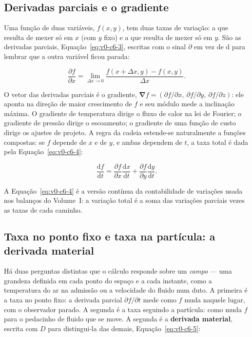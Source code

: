 \documentclass[12pt,a4paper]{article}
\numberwithin{equation}{section}
\numberwithin{table}{section}
\numberwithin{figure}{section}
\begin{document}
\subsection{Derivadas parciais e o gradiente}

Uma função de duas variáveis, $f(x,y)$, tem duas taxas de variação: a que
resulta de mexer só em $x$ (com $y$ fixo) e a que resulta de mexer só em
$y$. São as derivadas parciais, Equação~\eqref{eq:v0-c6-3}, escritas com o
sinal $\partial$ em vez de $\mathrm{d}$ para lembrar que a outra variável
ficou parada:

\begin{equation}\label{eq:v0-c6-3}
\frac{\partial f}{\partial x}
  = \lim_{\Delta x \to 0}
    \frac{f(x+\Delta x, y) - f(x,y)}{\Delta x}.
\end{equation}

O vetor das derivadas parciais é o gradiente,
$\bm{\nabla} f = (\partial f/\partial x,\ \partial f/\partial y,\ 
\partial f/\partial z)$: ele aponta na direção de maior crescimento de
$f$ e seu módulo mede a inclinação máxima. O gradiente de temperatura
dirige o fluxo de calor na lei de Fourier; o gradiente de pressão dirige o
escoamento; o gradiente de uma função de custo dirige os ajustes de
projeto. A regra da cadeia estende-se naturalmente a funções compostas: se
$f$ depende de $x$ e de $y$, e ambas dependem de $t$, a taxa total é dada
pela Equação~\eqref{eq:v0-c6-4}:

\begin{equation}\label{eq:v0-c6-4}
\frac{\mathrm{d}f}{\mathrm{d}t}
  = \frac{\partial f}{\partial x}\frac{\mathrm{d}x}{\mathrm{d}t}
  + \frac{\partial f}{\partial y}\frac{\mathrm{d}y}{\mathrm{d}t}.
\end{equation}

A Equação~\eqref{eq:v0-c6-4} é a versão contínua da contabilidade de
variações usada nos balanços do Volume~I: a variação total é a soma das
variações parciais vezes as taxas de cada caminho.

\subsection{Taxa no ponto fixo e taxa na partícula: a derivada material}

Há duas perguntas distintas que o cálculo responde sobre um \emph{campo}
--- uma grandeza definida em cada ponto do espaço e a cada instante, como a
temperatura do ar na admissão ou a velocidade do fluido num duto. A
primeira é a taxa no ponto fixo: a derivada parcial
$\partial f/\partial t$ mede como $f$ muda naquele lugar, com o observador
parado. A segunda é a taxa seguindo a partícula: como muda $f$ para o
pedacinho de fluido que se move. A segunda é a \textbf{derivada material},
escrita com $D$ para distingui-la das demais, Equação~\eqref{eq:v0-c6-5}:
\end{document}
